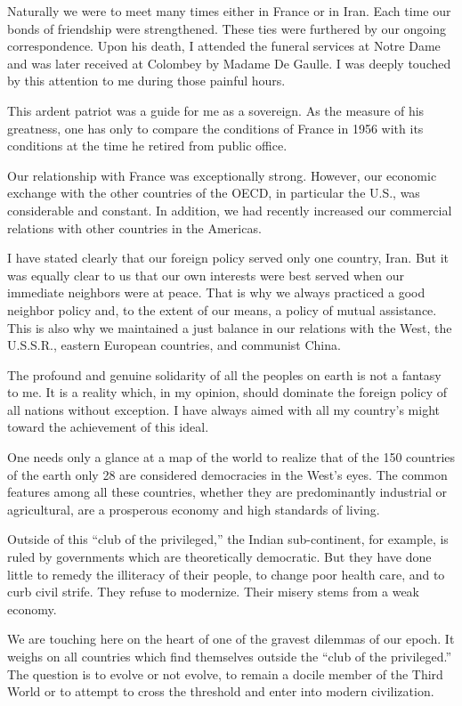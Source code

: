 Naturally we were to meet many times either in France or in Iran. Each time our bonds of friendship were strengthened. These ties were furthered by our ongoing correspondence. Upon his death, I attended the funeral services at Notre Dame and was later received at Colombey by Madame De Gaulle. I was deeply touched by this attention to me during those painful hours. 

This ardent patriot was a guide for me as a sovereign. As the measure of his greatness, one has only to compare the conditions of France in 1956 with its conditions at the time he retired from public office. 

Our relationship with France was exceptionally strong. However, our economic exchange with the other countries of the OECD, in particular the U.S., was considerable and constant. In addition, we had recently increased our commercial relations with other countries in the Americas. 

I have stated clearly that our foreign policy served only one country, Iran. But it was equally clear to us that our own interests were best served when our immediate neighbors were at peace. That is why we always practiced a good neighbor policy and, to the extent of our means, a policy of mutual assistance. This is also why we maintained a just balance in our relations with the West, the U.S.S.R., eastern European countries, and communist China. 

The profound and genuine solidarity of all the peoples on earth is not a fantasy to me. It is a reality which, in my opinion, should dominate the foreign policy of all nations without exception. I have always aimed with all my country's might toward the achievement of this ideal. 

One needs only a glance at a map of the world to realize that of the 150 countries of the earth only 28 are considered democracies in the West's eyes. The common features among all these countries, whether they are predominantly industrial or agricultural, are a prosperous economy and high standards of living. 

Outside of this “club of the privileged,” the Indian sub-continent, for example, is ruled by governments which are theoretically democratic. But they have done little to remedy the illiteracy of their people, to change poor health care, and to curb civil strife. They refuse to modernize. Their misery stems from a weak economy. 

We are touching here on the heart of one of the gravest dilemmas of our epoch. It weighs on all countries which find themselves outside the “club of the privileged.” The question is to evolve or not evolve, to remain a docile member of the Third World or to attempt to cross the threshold and enter into modern civilization. 

